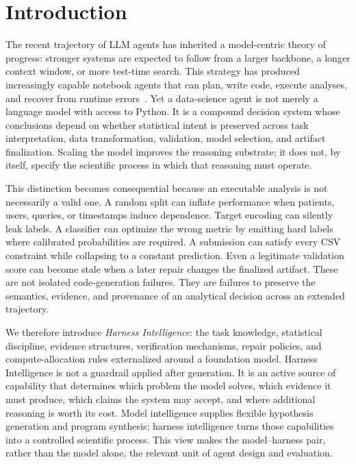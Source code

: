 \documentclass[letterpaper]{article} %
\begin{document}
\section{Introduction}

The recent trajectory of LLM agents has inherited a model-centric theory of progress: stronger systems are expected to follow from a larger backbone, a longer context window, or more test-time search. This strategy has produced increasingly capable notebook agents that can plan, write code, execute analyses, and recover from runtime errors~\cite{wang2024data, guo2024data}. Yet a data-science agent is not merely a language model with access to Python. It is a compound decision system whose conclusions depend on whether statistical intent is preserved across task interpretation, data transformation, validation, model selection, and artifact finalization. Scaling the model improves the reasoning substrate; it does not, by itself, specify the scientific process in which that reasoning must operate.

This distinction becomes consequential because an executable analysis is not necessarily a valid one. A random split can inflate performance when patients, users, queries, or timestamps induce dependence. Target encoding can silently leak labels. A classifier can optimize the wrong metric by emitting hard labels where calibrated probabilities are required. A submission can satisfy every CSV constraint while collapsing to a constant prediction. Even a legitimate validation score can become stale when a later repair changes the finalized artifact. These are not isolated code-generation failures. They are failures to preserve the semantics, evidence, and provenance of an analytical decision across an extended trajectory.

We therefore introduce \emph{Harness Intelligence}: the task knowledge, statistical discipline, evidence structures, verification mechanisms, repair policies, and compute-allocation rules externalized around a foundation model. Harness Intelligence is not a guardrail applied after generation. It is an active source of capability that determines which problem the model solves, which evidence it must produce, which claims the system may accept, and where additional reasoning is worth its cost. Model intelligence supplies flexible hypothesis generation and program synthesis; harness intelligence turns those capabilities into a controlled scientific process. This view makes the model--harness pair, rather than the model alone, the relevant unit of agent design and evaluation.
\end{document}
